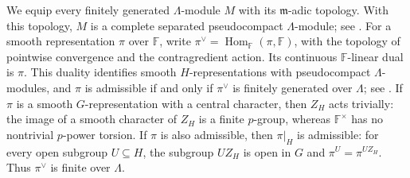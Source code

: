 \documentclass[11pt]{article}
\numberwithin{equation}{section}
\theoremstyle{definition}
\theoremstyle{remark}
\newcommand{\F}{\mathbb F}
\newcommand{\fm}{\mathfrak m}
\DeclareMathOperator{\Hom}{Hom}
\begin{document}
We equip every finitely generated $\Lambda$-module $M$ with its
$\fm$-adic topology. With this topology, $M$ is a complete separated
pseudocompact $\Lambda$-module; see \cite[\S~1]{Koh17}.
For a smooth representation $\pi$ over $\F$, write
$\pi^\vee=\Hom_{\F}(\pi,\F)$, with the topology of pointwise
convergence and the contragredient action. Its continuous
$\F$-linear dual is $\pi$. This duality identifies smooth
$H$-representations with pseudocompact $\Lambda$-modules, and $\pi$ is
admissible if and only if $\pi^\vee$ is finitely generated over
$\Lambda$; see \cite[Thm.~1.5, Cor.~1.8 and Prop.~1.9]{Koh17}.
If $\pi$ is a smooth $G$-representation with a central character, then
$Z_H$ acts trivially: the image of a smooth character of $Z_H$
is a finite $p$-group, whereas $\F^\times$ has no nontrivial
$p$-power torsion. If $\pi$ is also admissible, then $\pi|_H$ is admissible:
for every open subgroup $U\subseteq H$, the subgroup $UZ_H$ is open
in $G$ and $\pi^U=\pi^{UZ_H}$. Thus $\pi^\vee$ is finite over
$\Lambda$.
\end{document}
